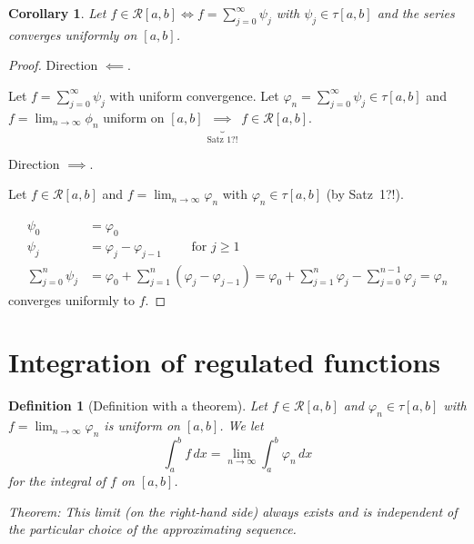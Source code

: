 \documentclass{article}
\newtheorem{definition}{Definition}  \numberwithin{definition}{section}
\newtheorem*{corollary}{Corollary}%
\begin{document}
\begin{corollary}
  Let $f \in \mathcal R[a,b] \iff f = \sum_{j=0}^\infty \psi_j$ with $\psi_j \in \tau[a,b]$ and the series converges uniformly on $[a,b]$.
\end{corollary}

\begin{proof}
  Direction $\impliedby$.

  Let $f = \sum_{j=0}^\infty \psi_j$ with uniform convergence.
  Let $\varphi_n = \sum_{j=0}^\infty \psi_j \in \tau[a,b]$ and $f = \lim_{n\to\infty} \phi_n$ uniform on $[a,b] \underbrace{\implies}_{\text{Satz~1?!}} f \in \mathcal R[a,b]$. %

  Direction $\implies$.

  Let $f \in \mathcal R[a,b]$ and $f = \lim_{n\to\infty} \varphi_n$ with $\varphi_n \in \tau[a,b]$ (by Satz~1?!).

  \begin{align*}
    \psi_0 &= \varphi_0 \\
    \psi_j &= \varphi_j - \varphi_{j-1} \qquad \text{ for } j \geq 1 \\
    \sum_{j=0}^n \psi_j &= \varphi_0 + \sum_{j=1}^n (\varphi_j - \varphi_{j-1}) = \varphi_0 + \sum_{j=1}^n \varphi_j - \sum_{j=0}^{n-1} \varphi_j = \varphi_n
  \end{align*}
  converges uniformly to $f$.
\end{proof}

\section{Integration of regulated functions}

\begin{definition}[Definition with a theorem] %
  Let $f \in \mathcal R[a,b]$ and $\varphi_n \in \tau[a,b]$ with $f = \lim_{n\to\infty} \varphi_n$ is uniform on $[a,b]$.
  We let
  \[ \int_a^b f \, dx = \lim_{n\to\infty} \int_a^b \varphi_n \, dx \]
  for the integral of $f$ on $[a,b]$.

  Theorem: This limit (on the right-hand side) always exists and is independent of the particular choice of the approximating sequence.
\end{definition}
\end{document}

